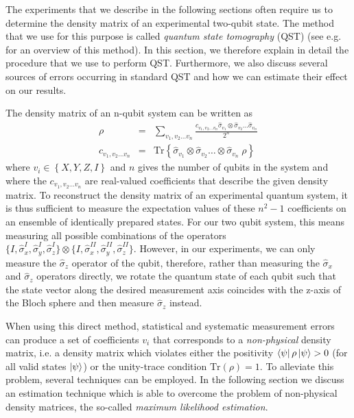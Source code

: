 The experiments that we describe in the following sections often require us to determine the density matrix of an experimental two-qubit state. The method that we use for this purpose is called {\it quantum state tomography} (QST) (see e.g. \cite{nielsen_quantum_2000} for an overview of this method). In this section, we therefore explain in detail the procedure that we use to perform QST. Furthermore, we also discuss several sources of errors occurring in standard QST and how we can estimate their effect on our results.

\smallskip

The density matrix of an n-qubit system can be written as
%
\begin{eqnarray}
\rho & = & \sum\limits_{v_1,v_2\hdots v_n} \frac{c_{v_1,v_2\hdots v_n} \hat{\sigma}_{v_1}\otimes \hat{\sigma}_{v_2}\hdots \hat{\sigma}_{v_n}}{2^n} \label{eq:state_tomography_state_representation} \\
c_{v_1,v_2\hdots v_n} & = & \mathrm{Tr}\left\{\hat{\sigma}_{v_1}\otimes \hat{\sigma}_{v_2}\hdots \otimes\hat{\sigma}_{v_n} \; \rho \right\} \label{eq:state_tomography_coefficients}
\end{eqnarray}
%
where $v_i \in \left\{ X,Y,Z,I\right\}$ and $n$ gives the number of qubits in the system and where the $c_{v_1,v_2\hdots v_n}$ are real-valued coefficients that describe the given density matrix. To reconstruct the density matrix of an experimental quantum system, it is thus sufficient to measure the expectation values of these $n^2-1$ coefficients on an ensemble of identically prepared states. For our two qubit system, this means measuring all possible combinations of the operators $\{I,\hat{\sigma}_x^I,\hat{\sigma}_y^I,\hat{\sigma}_z^I\}\otimes\{I,\hat{\sigma}_x^{II},\hat{\sigma}_y^{II},\hat{\sigma}_z^{II}\}$. However, in our experiments, we can only measure the $\hat{\sigma}_z$ operator of the qubit, therefore, rather than measuring the $\hat{\sigma}_x$ and $\hat{\sigma}_z$ operators directly, we rotate the quantum state of each qubit such that the state vector along the desired measurement axis coincides with the z-axis of the Bloch sphere and then measure $\hat{\sigma}_z$ instead.

When using this direct method, statistical and systematic measurement errors can produce a set of coefficients $v_i$ that corresponds to a {\it non-physical} density matrix, i.e. a density matrix which violates either the positivity $\left< \psi \right|\rho\left| \psi \right> > 0$ (for all valid states $\left| \psi \right>$) or the unity-trace condition $\mathrm{Tr}(\rho)=1$. To alleviate this problem, several techniques can be employed. In the following section we discuss an estimation technique which is able to overcome the problem of non-physical density matrices, the so-called {\it maximum likelihood estimation}.

